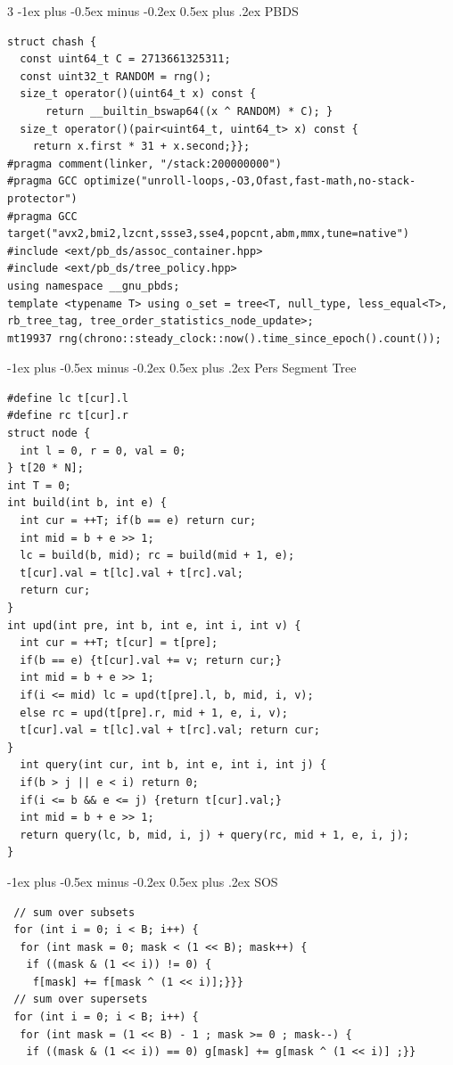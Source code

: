 \documentclass[8pt,a4paper,onesided]{article}
\makeatletter
\renewcommand{\subsection}{\@startsection{subsection}{2}{0mm}
    {-1ex plus -0.5ex minus -0.2ex} %
    {0.5ex plus .2ex}                %
    {\normalfont\large\bfseries}}    %
\makeatother
\begin{document}
\begin{multicols}{3}
\subsection{PBDS}
\begin{verbatim}
struct chash {
  const uint64_t C = 2713661325311;
  const uint32_t RANDOM = rng();
  size_t operator()(uint64_t x) const {
      return __builtin_bswap64((x ^ RANDOM) * C); }
  size_t operator()(pair<uint64_t, uint64_t> x) const { 
    return x.first * 31 + x.second;}};
#pragma comment(linker, "/stack:200000000")
#pragma GCC optimize("unroll-loops,-O3,Ofast,fast-math,no-stack-protector")
#pragma GCC target("avx2,bmi2,lzcnt,ssse3,sse4,popcnt,abm,mmx,tune=native")
#include <ext/pb_ds/assoc_container.hpp>
#include <ext/pb_ds/tree_policy.hpp>
using namespace __gnu_pbds;
template <typename T> using o_set = tree<T, null_type, less_equal<T>, rb_tree_tag, tree_order_statistics_node_update>;
mt19937 rng(chrono::steady_clock::now().time_since_epoch().count());
\end{verbatim}
\subsection{Pers Segment Tree}
\begin{verbatim}
#define lc t[cur].l
#define rc t[cur].r
struct node {
  int l = 0, r = 0, val = 0;
} t[20 * N];
int T = 0;
int build(int b, int e) {
  int cur = ++T; if(b == e) return cur;
  int mid = b + e >> 1;
  lc = build(b, mid); rc = build(mid + 1, e);
  t[cur].val = t[lc].val + t[rc].val;
  return cur;
}
int upd(int pre, int b, int e, int i, int v) {
  int cur = ++T; t[cur] = t[pre];
  if(b == e) {t[cur].val += v; return cur;}
  int mid = b + e >> 1;
  if(i <= mid) lc = upd(t[pre].l, b, mid, i, v);
  else rc = upd(t[pre].r, mid + 1, e, i, v);
  t[cur].val = t[lc].val + t[rc].val; return cur;
}
  int query(int cur, int b, int e, int i, int j) {
  if(b > j || e < i) return 0;
  if(i <= b && e <= j) {return t[cur].val;}
  int mid = b + e >> 1;
  return query(lc, b, mid, i, j) + query(rc, mid + 1, e, i, j);
}
\end{verbatim}
\subsection{SOS}
\begin{verbatim}
 // sum over subsets
 for (int i = 0; i < B; i++) {
  for (int mask = 0; mask < (1 << B); mask++) {
   if ((mask & (1 << i)) != 0) {
    f[mask] += f[mask ^ (1 << i)];}}}
 // sum over supersets
 for (int i = 0; i < B; i++) {
  for (int mask = (1 << B) - 1 ; mask >= 0 ; mask--) {
   if ((mask & (1 << i)) == 0) g[mask] += g[mask ^ (1 << i)] ;}}
\end{verbatim}

\end{multicols}
\end{document}
